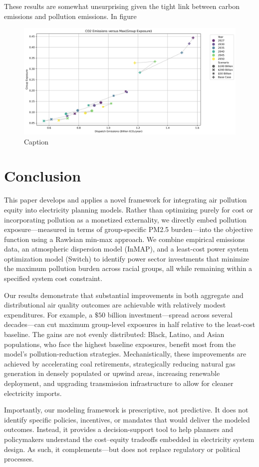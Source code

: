 \documentclass[a4paper]{article}
\theoremstyle{definition}
\theoremstyle{plain}
\begin{document}
These results are somewhat unsurprising given the tight link between carbon emissions and pollution emissions. In figure \


\begin{figure}
    \centering
    \includegraphics[width=0.5\linewidth]{Figures/EndogenousPaper/emissions_vs_exposure.png}
    \caption{Caption}
    \label{emissionsexposure}
\end{figure}
\section{Conclusion}
This paper develops and applies a novel framework for integrating air pollution equity into electricity planning models. Rather than optimizing purely for cost or incorporating pollution as a monetized externality, we directly embed pollution exposure—measured in terms of group-specific PM2.5 burden—into the objective function using a Rawlsian min-max approach. We combine empirical emissions data, an atmospheric dispersion model (InMAP), and a least-cost power system optimization model (Switch) to identify power sector investments that minimize the maximum pollution burden across racial groups, all while remaining within a specified system cost constraint.

Our results demonstrate that substantial improvements in both aggregate and distributional air quality outcomes are achievable with relatively modest expenditures. For example, a $\$50$ billion investment—spread across several decades—can cut maximum group-level exposures in half relative to the least-cost baseline. The gains are not evenly distributed: Black, Latino, and Asian populations, who face the highest baseline exposures, benefit most from the model’s pollution-reduction strategies. Mechanistically, these improvements are achieved by accelerating coal retirements, strategically reducing natural gas generation in densely populated or upwind areas, increasing renewable deployment, and upgrading transmission infrastructure to allow for cleaner electricity imports.

Importantly, our modeling framework is prescriptive, not predictive. It does not identify specific policies, incentives, or mandates that would deliver the modeled outcomes. Instead, it provides a decision-support tool to help planners and policymakers understand the cost–equity tradeoffs embedded in electricity system design. As such, it complements—but does not replace regulatory or political processes.
\end{document}

